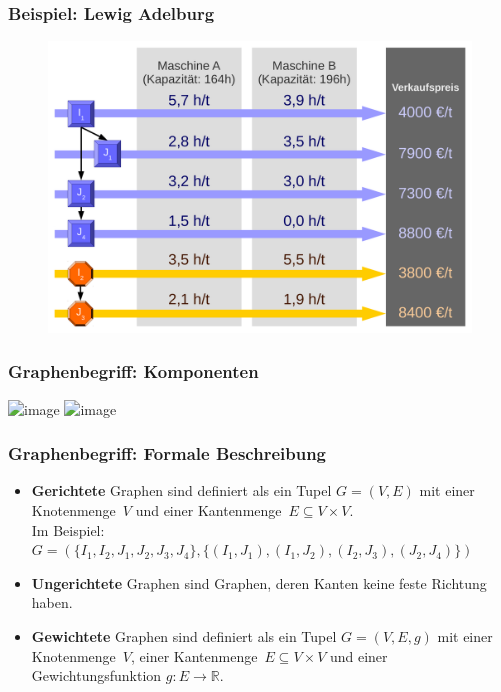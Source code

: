
\begin{frame}
 \frametitle{Beispiel: Lewig Adelburg}
 \begin{figure}
  \centering
  \includegraphics[width=\linewidth]{Bilder/LewigAdelburg}
 \end{figure}
\end{frame}

\begin{frame}
 \frametitle{Graphenbegriff: Komponenten}
 \begin{center}
  \includegraphics<1>[width=.7\linewidth,page=1]{Bilder/Graph_Lewig_Adelburg}
  \includegraphics<2>[width=.7\linewidth,page=2]{Bilder/Graph_Lewig_Adelburg}
 \end{center}
\end{frame}

\begin{frame}
 \frametitle{Graphenbegriff: Formale Beschreibung}
 \begin{itemize}
  \item \textbf{Gerichtete} Graphen sind definiert als ein Tupel $G=(V, E)$ mit einer Knotenmenge~$V$ und einer Kantenmenge~$E\subseteq V\times V$.\\[1ex]
    Im Beispiel:\\{\footnotesize $G = (\{I_1, I_2, J_1, J_2, J_3, J_4\}, \{(I_1, J_1), (I_1, J_2), (I_2, J_3), (J_2, J_4)\})$}
  \item \textbf{Ungerichtete} Graphen sind Graphen, deren Kanten keine feste Richtung haben.
  \item \textbf{Gewichtete} Graphen sind definiert als ein Tupel $G=(V, E, g)$ mit einer Knotenmenge~$V$, einer Kantenmenge~$E\subseteq V\times V$ und einer Gewichtungsfunktion $g:E\rightarrow\mathbb{R}$.
 \end{itemize}
\end{frame}
